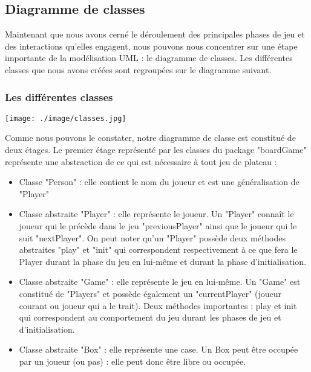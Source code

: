 \documentclass[12pt , a4paper]{article}
\begin{document}
	
\subsection{Diagramme de classes}
\noindent Maintenant que nous avons cerné le déroulement des principales phases de jeu et des interactions qu'elles engagent, nous pouvons nous concentrer sur une étape importante de la modélisation UML : le diagramme de classes. Les différentes classes que nous avons créées sont regroupées sur le diagramme suivant.
\begin{landscape}
\subsubsection{Les différentes classes}
	\begin{center}
	  \texttt{[image: ./image/classes.jpg]}
	\end{center}
\end{landscape}
\noindent Comme nous pouvons le constater, notre diagramme de classe est constitué de deux étages. Le premier étage représenté par les classes du package "boardGame" représente une abstraction de ce qui est nécessaire à tout jeu de plateau :
\begin{itemize}
	\item Classe "Person" :  elle contient le nom du joueur et est une généralisation de "Player"
	\item Classe abstraite "Player" : elle représente le joueur. Un "Player" connaît le joueur qui le précède dans le jeu "previousPlayer" ainsi que le joueur qui le suit "nextPlayer". On peut noter qu'un "Player" possède deux méthodes abstraites "play" et "init" qui correspondent respectivement à ce que fera le Player durant la phase du jeu en lui-même et  durant la phase d'initialisation.
	\item Classe abstraite "Game" : elle représente le jeu en lui-même. Un "Game" est constitué de "Players" et possède également un "currentPlayer" (joueur courant ou joueur qui a le trait). Deux méthodes importantes : play et init qui correspondent au comportement du jeu durant les phases de jeu et d'initialisation.
	\item Classe abstraite "Box" : elle représente une case. Un Box peut être occupée par un joueur (ou pas) : elle peut donc être libre ou occupée.
\end{itemize}
\end{document}
